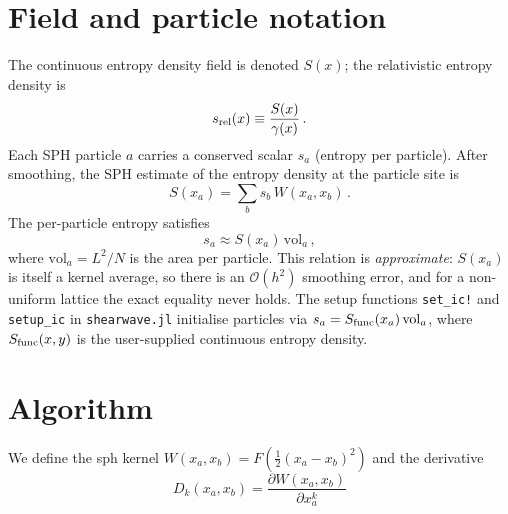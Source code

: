 \documentclass[12pt,aps,preprint,nofootinbib,noshowkeys,noshowpacs,longbibliography,superscriptaddress,tightenlines]{revtex4-2}
\def\half{\tfrac{1}{2}}
\def\st{\begin{equation}}
\def\stp{\end{equation}}
\begin{document}
\section{Field and particle notation}

The continuous entropy density field is denoted $S(x)$; the relativistic entropy density is
\st
s_{\rm rel}(x) \equiv \frac{S(x)}{\gamma(x)} \, .
\stp
Each SPH particle $a$ carries a conserved scalar $s_a$ (entropy per particle).
After smoothing, the SPH estimate of the entropy density at the particle site is
\st
S(x_a) = \sum_b s_b\, W(x_a, x_b) \, .
\stp
The per-particle entropy satisfies
\st
s_a \approx S(x_a)\,\mathrm{vol}_a \, ,
\stp
where $\mathrm{vol}_a = L^2/N$ is the area per particle.  This relation is
\emph{approximate}: $S(x_a)$ is itself a kernel average, so there is an $\mathcal{O}(h^2)$
smoothing error, and for a non-uniform lattice the exact equality never holds.
The setup functions \texttt{set\_ic!} and \texttt{setup\_ic} in \texttt{shearwave.jl}
initialise particles via $s_a = S_{\rm func}(x_a)\,\mathrm{vol}_a$, where
$S_{\rm func}(x,y)$ is the user-supplied continuous entropy density.

\section{Algorithm}
We define the sph kernel $W(x_a, x_b) = F(\half (x_a  - x_b)^2 )$ and the derivative
\st
D_k(x_a, x_b) = \frac{\partial W(x_a, x_b)}{\partial x_a^k} 
\stp
\end{document}
